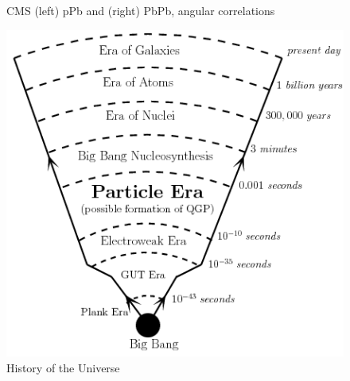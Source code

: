 \begin{figure}%
    \centering
    \qquad
    \caption{CMS (left) pPb and (right) PbPb, angular correlations \cite{Chatrchyan:2013nka}}%
    \label{fig:exampleRidge}%
\end{figure}

\begin{figure}[h!]
\begin{centering}
\includegraphics[width=5in]{Chapter1/importfigs/fig_bb_timeline.png}
\par\end{centering}
\caption{History of the Universe \cite{Bandyopadhyay:2017wip} \label{fig:history}}
\end{figure}

